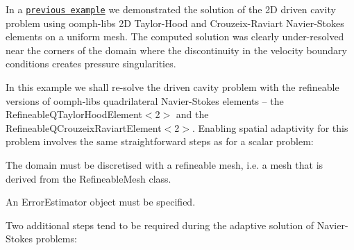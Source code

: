 In a \href{../../driven_cavity/html/index.html}{\tt previous example} we demonstrated the solution of the 2D driven cavity problem using {\ttfamily oomph-\/lib\textquotesingle{}s} 2D Taylor-\/\+Hood and Crouzeix-\/\+Raviart Navier-\/\+Stokes elements on a uniform mesh. The computed solution was clearly under-\/resolved near the corners of the domain where the discontinuity in the velocity boundary conditions creates pressure singularities.

In this example we shall re-\/solve the driven cavity problem with the refineable versions of {\ttfamily oomph-\/lib\textquotesingle{}s} quadrilateral Navier-\/\+Stokes elements -- the {\ttfamily Refineable\+Q\+Taylor\+Hood\+Element$<$2$>$} and the {\ttfamily Refineable\+Q\+Crouzeix\+Raviart\+Element$<$2$>$}. Enabling spatial adaptivity for this problem involves the same straightforward steps as for a scalar problem\+:
\begin{DoxyItemize}
\item The domain must be discretised with a refineable mesh, i.\+e. a mesh that is derived from the {\ttfamily Refineable\+Mesh} class.
\item An {\ttfamily Error\+Estimator} object must be specified.
\end{DoxyItemize}Two additional steps tend to be required during the adaptive solution of Navier-\/\+Stokes problems\+:
